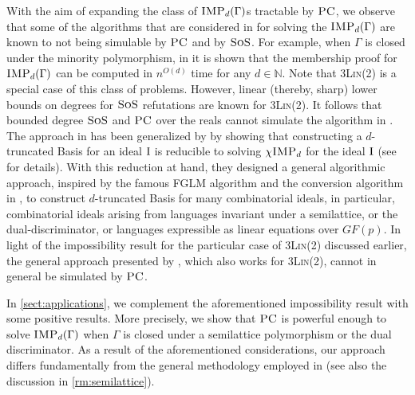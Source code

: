 \documentclass[11pt]{article}
\newcommand{\sos}{\text{\sc{SoS}}}
\newcommand{\IMP}{\textsc{IMP}}
\newcommand{\PC}{\textsc{PC}}
\newcommand{\Nsatz}{\textsc{Nsatz}}
\newcommand{\I}{\emph{$\rm{I}$}}
\newcommand{\1}{\textbf{1}}
\newcommand{\GB}{\text{Gr\"{o}bner} }
\begin{document}
With the aim of expanding the class of $\IMP_d(\Gamma)$s tractable by $\PC$, we observe that some of the algorithms that are considered in \cite{BulatovRSTOC22, BulatovRSTACS22, Mastrolilli21TALG, BharathiM21} for solving the $\IMP_d(\Gamma)$ are known to not being simulable by $\PC$ and by $\sos$.  For example, when $\Gamma$ is closed under the minority polymorphism, in \cite{BharathiM21} it is shown that the membership proof for $\IMP_d(\Gamma)$ can be computed in $n^{O(d)}$ time for any $d\in \mathbb{N}$.
Note that \textsc{3Lin(2)} is a special case of this class of problems. However,  linear (thereby, sharp) lower bounds on degrees for $\sos$ refutations are known \cite{GRIGORIEV2001613} for \textsc{3Lin(2)}.
%
It follows that bounded degree $\sos$ and $\PC$ over the reals cannot simulate the algorithm in \cite{BharathiM21}. 
The approach in \cite{BharathiM21} has been generalized by \cite{BulatovRSTOC22} by showing that constructing a $d$-truncated \GB Basis for an ideal $\I$ is reducible to solving $\chi\IMP_d$ for the ideal $\I$ (see \cite{BulatovRSTOC22} for details). With this reduction at hand, they designed a general algorithmic approach,
inspired by the famous FGLM algorithm \cite{FAUGERE1993329} and the conversion algorithm in \cite{BharathiM21}, to construct $d$-truncated \GB Basis for many combinatorial ideals, in particular, combinatorial ideals arising from languages invariant under a semilattice, or the dual-discriminator, or languages expressible as linear equations over $GF(p)$. In light of the impossibility result for the particular case of \textsc{3Lin(2)} discussed earlier, the general approach presented by \cite{BulatovRSTOC22}, which also works for \textsc{3Lin(2)}, cannot in general be simulated by $\PC$.

In \cref{sect:applications}, we complement the aforementioned impossibility result with some positive results. 
More precisely, we show that $\PC$ is powerful enough to solve $\IMP_d(\Gamma)$ when $\Gamma$ is closed under a semilattice polymorphism or the dual discriminator. 
As a result of the aforementioned considerations, our approach differs fundamentally from the general methodology employed in \cite{BulatovRSTOC22} (see also the discussion in \cref{rm:semilattice}).
%
\end{document}
